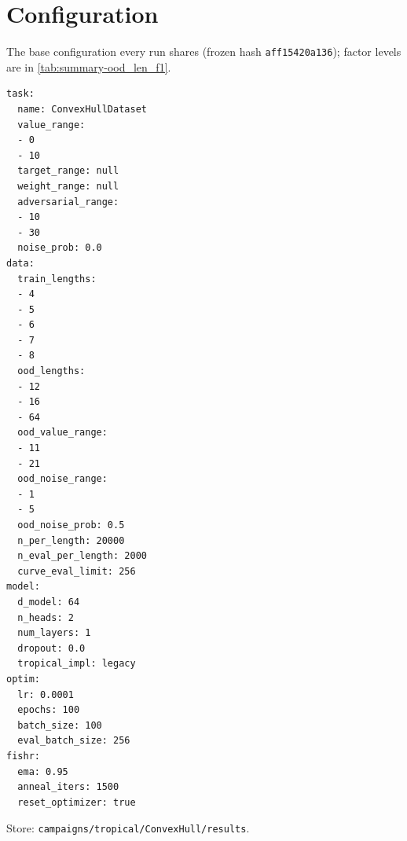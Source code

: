 \documentclass[10pt]{article}
\begin{document}
\section{Configuration}
The base configuration every run shares (frozen hash \texttt{aff15420a136}); factor levels are in \autoref{tab:summary-ood_len_f1}.
{\footnotesize
\begin{verbatim}
task:
  name: ConvexHullDataset
  value_range:
  - 0
  - 10
  target_range: null
  weight_range: null
  adversarial_range:
  - 10
  - 30
  noise_prob: 0.0
data:
  train_lengths:
  - 4
  - 5
  - 6
  - 7
  - 8
  ood_lengths:
  - 12
  - 16
  - 64
  ood_value_range:
  - 11
  - 21
  ood_noise_range:
  - 1
  - 5
  ood_noise_prob: 0.5
  n_per_length: 20000
  n_eval_per_length: 2000
  curve_eval_limit: 256
model:
  d_model: 64
  n_heads: 2
  num_layers: 1
  dropout: 0.0
  tropical_impl: legacy
optim:
  lr: 0.0001
  epochs: 100
  batch_size: 100
  eval_batch_size: 256
fishr:
  ema: 0.95
  anneal_iters: 1500
  reset_optimizer: true
\end{verbatim}
}
Store: \texttt{campaigns/tropical/ConvexHull/results}.
\end{document}
